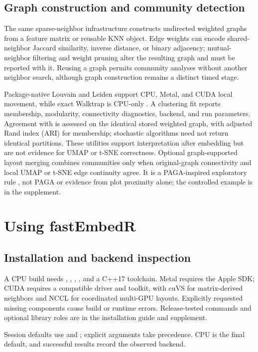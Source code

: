 \documentclass[article]{jss}
\begin{document}
\subsection{Graph construction and community detection}

The same sparse-neighbor infrastructure constructs undirected weighted graphs
from a feature matrix or reusable KNN object. Edge weights can encode
shared-neighbor Jaccard similarity, inverse distance, or binary adjacency;
mutual-neighbor filtering and weight pruning alter the resulting graph and
must be reported with it. Reusing a graph permits community analyses without
another neighbor search, although graph construction remains a distinct
timed stage.

Package-native Louvain and Leiden support CPU, Metal, and CUDA local
movement, while exact Walktrap is CPU-only
\citep{blondel2008,traag2019,pons2006}. A clustering fit reports membership,
modularity, connectivity diagnostics, backend, and run parameters. Agreement
with  is assessed on the identical stored weighted graph, with
adjusted Rand index (ARI) for membership; stochastic algorithms need not
return identical partitions. These utilities support interpretation after
embedding but are not evidence for UMAP or t-SNE correctness.
Optional graph-supported layout merging combines communities only when
original-graph connectivity and local UMAP or t-SNE edge continuity agree.
It is a PAGA-inspired exploratory rule \citep{wolf2019paga}, not PAGA or
evidence from plot proximity alone; the controlled example is in the
supplement.

\section{Using fastEmbedR}

\subsection{Installation and backend inspection}

A CPU build needs , , , , and
a C++17 toolchain. Metal requires the Apple SDK; CUDA requires a compatible
driver and toolkit, with cuVS for matrix-derived neighbors and NCCL for
coordinated multi-GPU layouts. Explicitly requested missing components
cause build or runtime errors. Release-tested commands and optional library
roles are in the installation guide and supplement.

Session defaults use  and
; explicit arguments take precedence. CPU is
the final default, and successful results record the observed backend.
\end{document}
